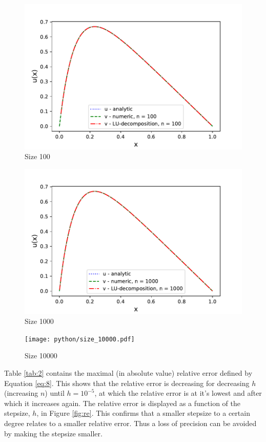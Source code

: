 \documentclass{article}
\begin{document}
\begin{figure}[h]
    \centering
    \includegraphics[width =12cm]{python/size_100.pdf}
    \caption{Size 100}
    \label{fig:2}
\end{figure}


\begin{figure}[h]
    \centering
    \includegraphics[width =12cm]{python/size_1000.pdf}
    \caption{Size 1000}
    \label{fig:3}
\end{figure}


\begin{figure}[h]
    \centering
    \texttt{[image: python/size\_10000.pdf]}
    \caption{Size 10000}
    \label{fig:4}
\end{figure}

Table \ref{tab:2} contains the maximal (in absolute value) relative error defined by Equation \ref{eq:8}. This shows that the relative error is decreasing for decreasing $h$ (increasing $n$) until $h = 10^{-5}$, at which the relative error is at it's lowest and after which it increases again. The relative error is displayed as a function of the stepsize, $h$, in Figure \ref{fig:re}. This confirms that a smaller stepsize to a certain degree relates to a smaller relative error. Thus a loss of precision can be avoided by making the stepsize smaller. 
\end{document}

